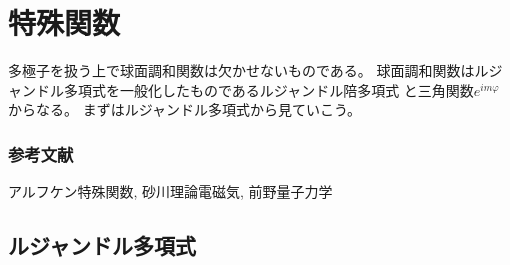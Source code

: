 \documentclass[../../master.tex]{subfiles}
\begin{document}
\chapter{特殊関数}
多極子を扱う上で球面調和関数は欠かせないものである。
球面調和関数はルジャンドル多項式を一般化したものであるルジャンドル陪多項式
と三角関数\(e^{im\varphi}\)からなる。
まずはルジャンドル多項式から見ていこう。
\subsection*{参考文献}
アルフケン特殊関数\cite{Arfken}, 砂川理論電磁気\cite{Sunakawa}, 前野量子力学\cite{Maeno_QM}

\section{ルジャンドル多項式}
\end{document}
